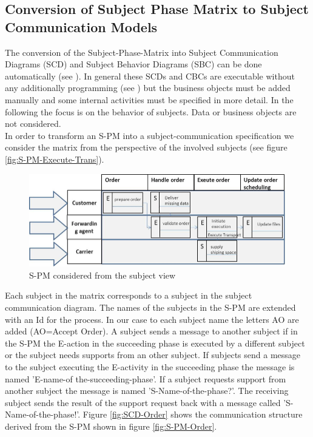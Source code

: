 \subsection{Conversion of Subject Phase Matrix to Subject Communication Models}
The conversion of the Subject-Phase-Matrix into Subject Communication Diagrams (SCD) and Subject Behavior Diagrams (SBC) can be done automatically (see \cite{book:flei2011}). In general these SCDs and CBCs are executable without any additionally programming (see \cite{book:flei2011}) but the business objects must be added manually and some internal activities must be specified in more detail. In the following the focus is on the behavior of subjects. Data or business objects are not considered.\\

In order to transform an S-PM into a subject-communication specification we consider the matrix from the perspective of the involved subjects (see figure \ref{fig:S-PM-Execute-Trans}).
\begin{figure}[hbtp]
	\includegraphics[scale=.4]{Figures/Chapter5/Subject-Phase/s-PM-subject-view.png}
	\caption{S-PM considered from the subject view}
	\label{fig:S-PM-subject-view}
\end{figure}
Each subject in the matrix corresponds to a subject in the subject communication diagram. The names of the subjects in the S-PM are extended with an Id for the process. In our case to each subject name the letters AO are added (AO=Accept Order). A subject sends a message to another subject if in the S-PM the E-action in the succeeding phase is executed by a different subject or the subject needs supports from an other subject. If subjects send a message to the subject executing the E-activity in the succeeding phase the message is named 'E-name-of the-succeeding-phase'. If a subject requests support from another subject the message is named 'S-Name-of-the-phase?'. The receiving subject sends the result of the support request back with a message called 'S-Name-of-the-phase!'. Figure \ref{fig:SCD-Order} shows the communication structure derived from the S-PM shown in figure \ref{fig:S-PM-Order}.
